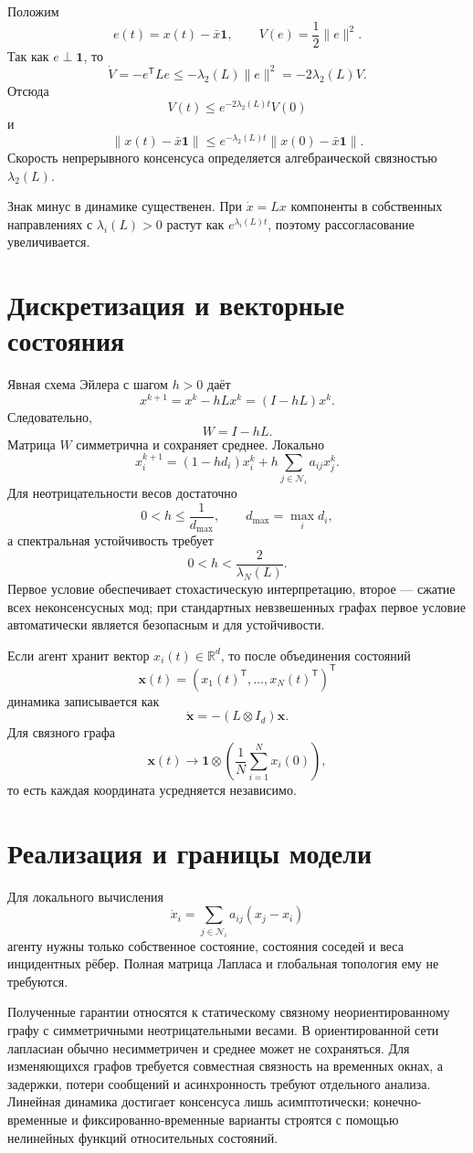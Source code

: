 Положим
\[
    e(t)=x(t)-\bar x\mathbf1,
    \qquad
    V(e)=\frac12\lVert e\rVert^2.
\]
Так как \(e\perp\mathbf1\), то
\[
    \dot V
    =
    -e^{\mathsf T}Le
    \le
    -\lambda_2(L)\lVert e\rVert^2
    =
    -2\lambda_2(L)V.
\]
Отсюда
\[
    V(t)
    \le
    e^{-2\lambda_2(L)t}V(0)
\]
и
\[
    \lVert x(t)-\bar x\mathbf1\rVert
    \le
    e^{-\lambda_2(L)t}
    \lVert x(0)-\bar x\mathbf1\rVert.
\]
Скорость непрерывного консенсуса определяется алгебраической
связностью \(\lambda_2(L)\).

Знак минус в динамике существенен. При \(\dot x=Lx\) компоненты в
собственных направлениях с \(\lambda_i(L)>0\) растут как
\(e^{\lambda_i(L)t}\), поэтому рассогласование увеличивается.

\section{Дискретизация и векторные состояния}

Явная схема Эйлера с шагом \(h>0\) даёт
\[
    x^{k+1}
    =
    x^k-hLx^k
    =
    (I-hL)x^k.
\]
Следовательно,
\[
    W=I-hL.
\]
Матрица \(W\) симметрична и сохраняет среднее. Локально
\[
    x_i^{k+1}
    =
    (1-hd_i)x_i^k
    +
    h\sum_{j\in\mathcal N_i}a_{ij}x_j^k.
\]
Для неотрицательности весов достаточно
\[
    0<h\le\frac1{d_{\max}},
    \qquad
    d_{\max}=\max_i d_i,
\]
а спектральная устойчивость требует
\[
    0<h<\frac2{\lambda_N(L)}.
\]
Первое условие обеспечивает стохастическую интерпретацию, второе ---
сжатие всех неконсенсусных мод; при стандартных невзвешенных графах
первое условие автоматически является безопасным и для устойчивости.

Если агент хранит вектор \(x_i(t)\in\mathbb R^d\), то после
объединения состояний
\[
    \mathbf x(t)
    =
    (x_1(t)^{\mathsf T},\ldots,x_N(t)^{\mathsf T})^{\mathsf T}
\]
динамика записывается как
\[
    \dot{\mathbf x}
    =
    -(L\otimes I_d)\mathbf x.
\]
Для связного графа
\[
    \mathbf x(t)
    \longrightarrow
    \mathbf1\otimes
    \left(
        \frac1N\sum_{i=1}^{N}x_i(0)
    \right),
\]
то есть каждая координата усредняется независимо.

\section{Реализация и границы модели}

Для локального вычисления
\[
    \dot x_i
    =
    \sum_{j\in\mathcal N_i}a_{ij}(x_j-x_i)
\]
агенту нужны только собственное состояние, состояния соседей и веса
инцидентных рёбер. Полная матрица Лапласа и глобальная топология ему
не требуются.

Полученные гарантии относятся к статическому связному
неориентированному графу с симметричными неотрицательными весами. В
ориентированной сети лапласиан обычно несимметричен и среднее может не
сохраняться. Для изменяющихся графов требуется совместная связность на
временных окнах, а задержки, потери сообщений и асинхронность требуют
отдельного анализа. Линейная динамика достигает консенсуса лишь
асимптотически; конечно-временные и фиксированно-временные варианты
строятся с помощью нелинейных функций относительных состояний.

